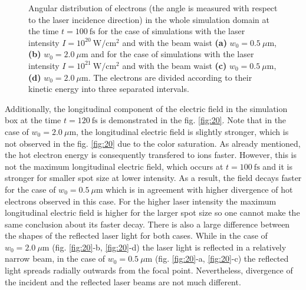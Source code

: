\begin{figure}[h!]
	\hspace{1mm}
	\caption{Angular distribution of electrons (the angle is measured with respect to the laser incidence direction) in the whole simulation domain at the time $ t = 100 \ \mathrm{fs} $ for the case of simulations with the laser intensity $ I = 10^{20} \ \mathrm{W/cm^2} $ and with the beam waist \textbf{(a)} $ w_0 = 0.5 \ \mu\mathrm{m} $, \textbf{(b)} $ w_0 = 2.0 \ \mu\mathrm{m} $ and for the case of simulations with the laser intensity $ I = 10^{21} \ \mathrm{W/cm^2} $ and with the beam waist \textbf{(c)} $ w_0 = 0.5 \ \mu\mathrm{m} $, \textbf{(d)} $ w_0 = 2.0 \ \mu\mathrm{m} $. The electrons are divided according to their kinetic energy into three separated intervals.}
	\label{fig:13}
\end{figure}

Additionally, the longitudinal component of the electric field in the simulation box at the time $ t = 120 \ \mathrm{fs} $ is demonstrated in the fig. \ref{fig:20}. Note that in the case of $ w_0 = 2.0 \ \mu\mathrm{m} $, the longitudinal electric field is slightly stronger, which is not observed in the fig. \ref{fig:20} due to the color saturation. As already mentioned, the hot electron energy is consequently transfered to ions faster. However, this is not the maximum longitudinal electric field, which occurs at $ t = 100 \ \mathrm{fs} $ and it is stronger for smaller spot size at lower intensity. As a result, the field decays faster for the case of $ w_0 = 0.5 \ \mu\mathrm{m} $ which is in agreement with higher divergence of hot electrons observed in this case. For the higher laser intensity the maximum longitudinal electric field is higher for the larger spot size so one cannot make the same conclusion about its faster decay. There is also a large difference between the shapes of the reflected laser light for both cases. While in the case of $ w_0 = 2.0 \ \mu\mathrm{m} $ (fig. \ref{fig:20}-b, \ref{fig:20}-d) the laser light is reflected in a relatively narrow beam, in the case of $ w_0 = 0.5 \ \mu\mathrm{m} $ (fig. \ref{fig:20}-a, \ref{fig:20}-c) the reflected light spreads radially outwards from the focal point. Nevertheless, divergence of the incident and the reflected laser beams are not much different.

